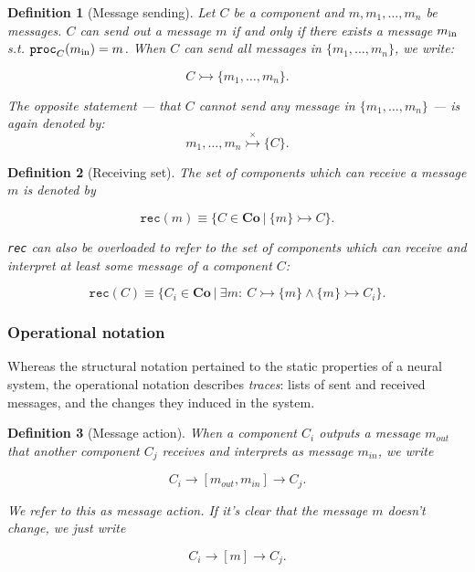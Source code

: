 \documentclass[]{scrartcl}
\theoremstyle{break}
\newtheorem{definition}{Definition}
\newcommand{\mt}[1]{\textnormal{#1}}
\renewcommand{\tt}[1]{\texttt{#1}}
\newcommand{\co}{\mathbf{Co}}
\newcommand{\cansend}[2]{#1 \rightarrowtail \{#2\}}
\newcommand{\cantsend}[2]{#1 \stackrel{\times}{\rightarrowtail} \{#2\}}
\newcommand{\canrec}[2]{\{#1\} \rightarrowtail #2}
\newcommand{\rec}[1]{\tt{rec}(#1)}
\newcommand{\proc}[1]{\tt{proc}_{#1}}
\begin{document}
\begin{definition}[Message sending]
	Let $C$ be a component and $m, m_1,\dots,m_n$ be messages. $C$ can send out a message $m$ if and only if there exists a message $m_{\mt{in}}$ s.t. $\proc{C}(m_{\mt{in}}) = m$.
	When $C$ can send all messages in $\{m_1,\dots,m_n\}$, we write:
	
	$$
		\cansend{C}{m_1,\dots,m_n}.
	$$
	
	The opposite statement --- that $C$ cannot send any message in $\{m_1,\dots,m_n\}$ --- is again denoted by:
	$$
		\cantsend{m_1,\dots,m_n}{C}.
	$$
\end{definition}

\begin{definition}[Receiving set]
	The set of components which can receive a message $m$ is denoted by
	
	$$
		\rec{m} \equiv \{C \in \co\ |\ \canrec{m}{C} \}.
	$$
	
	\tt{rec} can also be overloaded to refer to the set of components which can receive and interpret at least some message of a component $C$:
	
$$
	\rec{C} \equiv \{C_i \in \co\ |\ \exists m:\ \cansend{C}{m} \wedge \canrec{m}{C_i} \}.
$$
\end{definition}


\subsubsection{Operational notation}

Whereas the structural notation pertained to the static properties of a neural system, the operational notation describes {\em traces}: lists of sent and received messages, and the changes they induced in the system.

\begin{definition}[Message action]
	When a component $C_i$ outputs a message $m_{out}$ that another component $C_j$ receives and interprets as message $m_{in}$, we write
	
	$$
		C_i \rightarrow [m_{out}, m_{in}] \rightarrow C_j.
	$$
	
	We refer to this as {\em message action}. If it's clear that the message $m$ doesn't change, we just write
	
	$$
		C_i \rightarrow [m] \rightarrow C_j.
	$$
\end{definition}
\end{document}
